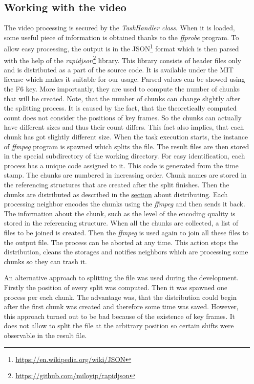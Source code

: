 \subsection*{Working with the video}

The video processing is secured by the \textit{TaskHandler class}. When
it is loaded, some useful piece of information is obtained thanks to the
\textit{ffprobe} program. To allow easy processing, the output is in the
JSON\footnote{\url{https://en.wikipedia.org/wiki/JSON}} format which is
then parsed with the help of the
\textit{rapidjson}\footnote{\url{https://github.com/miloyip/rapidjson}}
library. This library consists of header files only and is distributed
as a part of the source code. It is available under the MIT license
which makes it suitable for our usage. Parsed values can be showed using
the F6 key. More importantly, they are used to compute the number of
chunks that will be created. Note, that the number of chunks can change
slightly after the splitting process. It is caused by the fact, that the
theoretically computed count does not consider the positions of key
frames. So the chunks can actually have different sizes and thus their
count differs. This fact also implies, that each chunk has got slightly
different size. When the task execution starts, the instance of
\textit{ffmpeg} program is spawned which splits the file. The result
files are then stored in the special subdirectory of the working
directory. For easy identification, each process has a unique code
assigned to it. This code is generated from the time stamp. The chunks
are numbered in increasing order. Chunk names are stored in the
referencing structures that are created after the split finishes. Then
the chunks are distributed as described in the
\hyperref[distribution-of-chunks]{section} about distributing. Each
processing neighbor encodes the chunks using the \textit{ffmpeg} and
then sends it back. The information about the chunk, such as the level
of the encoding quality is stored in the referencing structure. When all
the chunks are collected, a list of files to be joined is created. Then
the \textit{ffmpeg} is used again to join all these files to the output
file. The process can be aborted at any time. This action stops the
distribution, cleans the storages and notifies neighbors which are
processing some chunks so they can trash it.

An alternative approach to splitting the file was used during the
development. Firstly the position of every split was computed. Then it
was spawned one process per each chunk. The advantage was, that the
distribution could begin after the first chunk was created and therefore
some time was saved. However, this approach turned out to be bad because
of the existence of key frames. It does not allow to split the file at
the arbitrary position so certain shifts were observable in the result
file.

